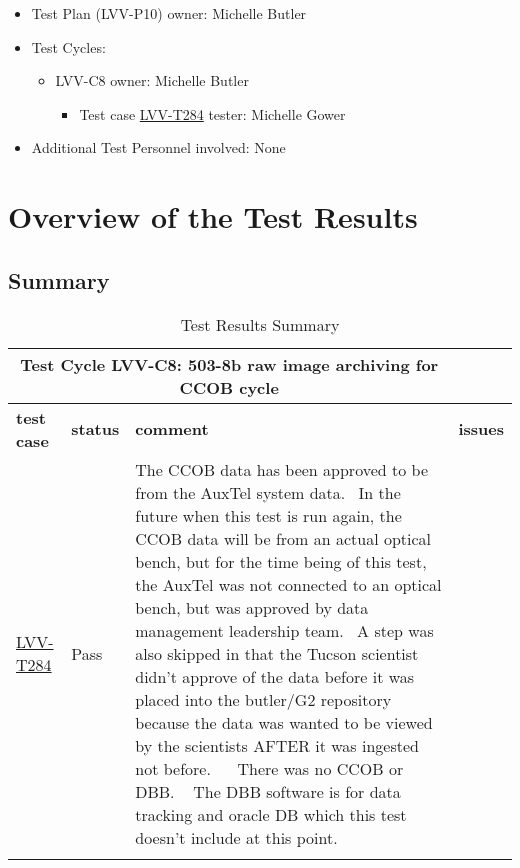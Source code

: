 \documentclass[DM,lsstdraft,STR,toc]{lsstdoc}
\begin{document}
\begin{itemize}
\item Test Plan (LVV-P10) owner: Michelle Butler
\item Test Cycles:
\begin{itemize}
  \item LVV-C8 owner: 
    Michelle Butler
  \begin{itemize}
    \item Test case \href{https://jira.lsstcorp.org/secure/Tests.jspa#/testCase/LVV-T284}{LVV-T284} tester: Michelle Gower
  \end{itemize}
\end{itemize}
\item Additional Test Personnel involved: None
\end{itemize}

\newpage

\section{Overview of the Test Results}
\label{sect:overview}

\subsection{Summary}
\label{sect:summarytable}

\begin{longtable}{p{}p{}p{}p{}}
\toprule

  \multicolumn{3}{c}{ Test Cycle {\bf LVV-C8: 503-8b raw image archiving for CCOB cycle
 }} \\\hline

  {\bf \footnotesize test case} & {\bf \footnotesize status} & {\bf \footnotesize comment} & {\bf \footnotesize issues} \\\toprule

    \href{https://jira.lsstcorp.org/secure/Tests.jspa#/testCase/LVV-T284}{LVV-T284}
    & Pass & The CCOB data has been approved to be from the AuxTel system data. ~In
the future when this test is run again, the CCOB data will be from an
actual optical bench, but for the time being of this test, the AuxTel
was not connected to an optical bench, but was approved by data
management leadership team. ~A step was also skipped in that the Tucson
scientist didn't approve of the data before it was placed into the
butler/G2 repository because the data was wanted to be viewed by the
scientists AFTER it was ingested not before. ~ ~There was no CCOB or
DBB. ~ The DBB software is for data tracking and oracle DB which this
test doesn't include at this point.~~
 &
    \\\hline

\caption{Test Results Summary}
\label{table:summary}
\end{longtable}
\end{document}
